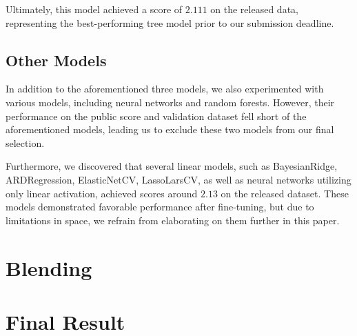 \documentclass[10pt,letterpaper]{article}
\begin{document}
Ultimately, this model achieved a score of $2.111$ on the released data, 
representing the best-performing tree model prior to our submission deadline.

\subsection{Other Models}

In addition to the aforementioned three models, we also experimented with various models, 
including neural networks and random forests. 
However, their performance on the public score and validation dataset fell short of the aforementioned models, 
leading us to exclude these two models from our final selection.

Furthermore, we discovered that several linear models, 
such as BayesianRidge, ARDRegression, ElasticNetCV, LassoLarsCV, as well as neural networks utilizing only linear activation, 
achieved scores around $2.13$ on the released dataset. 
These models demonstrated favorable performance after fine-tuning, 
but due to limitations in space, we refrain from elaborating on them further in this paper.

\section{Blending}
\section{Final Result}

\newpage






\end{document}
